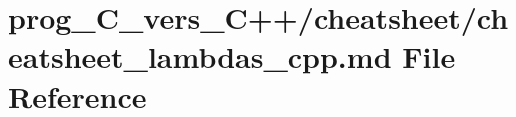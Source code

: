 \hypertarget{prog__C__vers__C_09_09_2cheatsheet_2cheatsheet__lambdas__cpp_8md}{}\section{prog\+\_\+\+C\+\_\+vers\+\_\+\+C++/cheatsheet/cheatsheet\+\_\+lambdas\+\_\+cpp.md File Reference}
\label{prog__C__vers__C_09_09_2cheatsheet_2cheatsheet__lambdas__cpp_8md}
